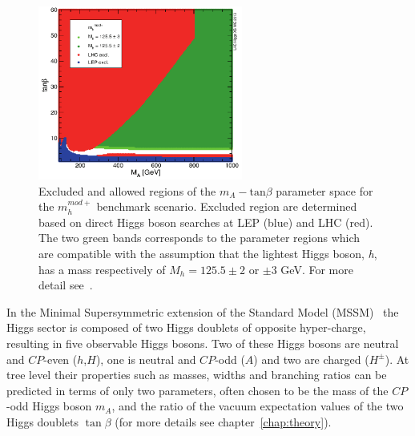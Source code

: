 \begin{figure}[tp]
     \begin{center}

            \includegraphics[width=0.6\textwidth]{figure/mh_mod.png}

    \end{center}
    \caption{Excluded and allowed regions of the $m_{A} - \text{tan}\beta$ parameter space for the  $m_{h}^{mod+}$ 
	benchmark scenario. Excluded region are determined based on direct Higgs boson searches at LEP (blue) and LHC (red). The two green 
	bands corresponds to the parameter regions which are compatible with the assumption that 
	the lightest Higgs boson, \emph{h}, has a mass respectively of $M_{h} = 125.5 \pm 2$ or $\pm 3$ GeV. For more detail 
	see~\cite{LHCxsec}.}
   \label{fig:mhmod}
\end{figure}

In the Minimal Supersymmetric extension of the Standard Model
(MSSM)~\cite{MSSM1, MSSM2} the Higgs sector is composed of two Higgs
doublets of opposite hyper-charge, resulting in five observable Higgs
bosons.  Two of these Higgs bosons are neutral and $CP$-even
($h$,$H$), one is neutral and $CP$-odd ($A$) and two are charged
($H^\pm$).  At tree level their properties such as masses, widths and
branching ratios can be predicted in terms of only two parameters,
often chosen to be the mass of the $CP$-odd Higgs boson $m_A$, and
the ratio of the vacuum expectation values of the two Higgs doublets
$\tan\beta$ (for more details see chapter~\ref{chap:theory}).  

